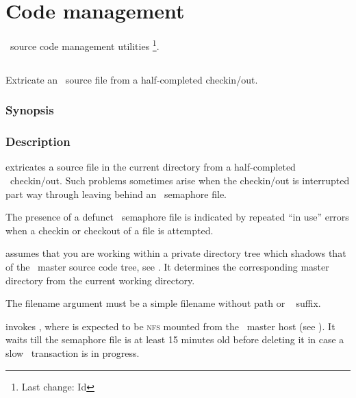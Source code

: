 \chapter{Code management}
\label{Code management}

\aipspp\ source code management utilities \footnote{Last change:
$ $Id$ $}.


\section{}
\label{ae}

Extricate an \aipspp\ source file from a half-completed checkin/out.

\subsection*{Synopsis}

\begin{synopsis}
\end{synopsis}

\subsection*{Description}

 extricates a source file in the current directory from a
half-completed \rcs\ checkin/out.  Such problems sometimes arise when the
checkin/out is interrupted part way through leaving behind an \rcs\ semaphore
file.

The presence of a defunct \rcs\ semaphore file is indicated by repeated
``in use'' errors when a checkin or checkout of a file is attempted.

 assumes that you are working within a private directory tree which
shadows that of the \aipspp\ master source code tree, see .
It determines the corresponding master directory from the current working
directory.

The filename argument must be a simple filename without path or \rcs\ 
 suffix.

 invokes , where  is
expected to be \textsc{nfs} mounted from the \aipspp\ master host (see
\sref{RCS directories}).  It waits till the semaphore file is at least 15
minutes old before deleting it in case a slow \rcs\ transaction is in
progress.

